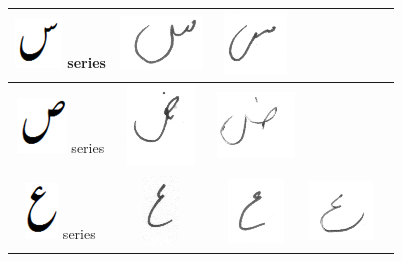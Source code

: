 \documentclass[a4paper,conference]{IEEEtran}
\begin{document}
\begin{table}[h]
\begin{tabular}{@{}ccccc@{}}
\hline
\includegraphics[scale=0.25]{seen_orig} series & \includegraphics[scale=0.15]{53} & \includegraphics[scale=0.15]{54}  & &  \\
\hline
\includegraphics[scale=0.20]{suad_orig} series & \includegraphics[scale=0.15]{55} & \includegraphics[scale=0.15]{56}  & & \\
\hline
\includegraphics[scale=0.15]{aien_orig} series & \includegraphics[scale=0.15]{57} & \includegraphics[scale=0.10]{58}  &
\includegraphics[scale=0.15]{59}  &  \\

\end{tabular}
\end{table}
\end{document}
